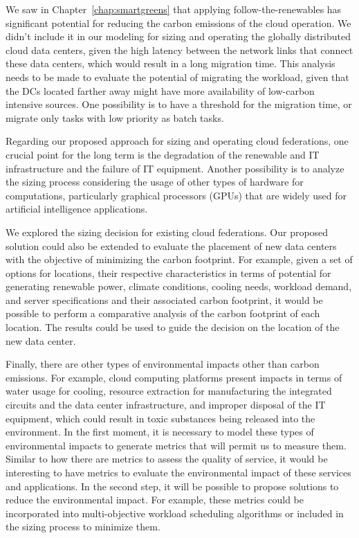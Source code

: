 We saw in Chapter~\ref{chap:smartgreens} that applying follow-the-renewables has significant potential for reducing the carbon emissions of the cloud operation. We didn't include it in our modeling for sizing and operating the globally distributed cloud data centers, given the high latency between the network links that connect these data centers, which would result in a long migration time. This analysis needs to be made to evaluate the potential of migrating the workload, given that the DCs located farther away might have more availability of low-carbon intensive sources. One possibility is to have a threshold for the migration time, or migrate only tasks with low priority as batch tasks.

Regarding our proposed approach for sizing and operating cloud federations, one crucial point for the long term is the degradation of the renewable and IT infrastructure and the failure of IT equipment. Another possibility is to analyze the sizing process considering the usage of other types of hardware for computations, particularly graphical processors (GPUs) that are widely used for artificial intelligence applications.

We explored the sizing decision for existing cloud federations. Our proposed solution could also be extended to evaluate the placement of new data centers with the objective of minimizing the carbon footprint. For example, given a set of options for locations, their respective characteristics in terms of potential for generating renewable power, climate conditions, cooling needs, workload demand, and server specifications and their associated carbon footprint, it would be possible to perform a comparative analysis of the carbon footprint of each location. The results could be used to guide the decision on the location of the new data center.

Finally, there are other types of environmental impacts other than carbon emissions. For example, cloud computing platforms present impacts in terms of water usage for cooling, resource extraction for manufacturing the integrated circuits and the data center infrastructure, and improper disposal of the IT equipment, which could result in toxic substances being released into the environment. In the first moment, it is necessary to model these types of environmental impacts to generate metrics that will permit us to measure them. Similar to how there are metrics to assess the quality of service, it would be interesting to have metrics to evaluate the environmental impact of these services and applications. In the second step, it will be possible to propose solutions to reduce the environmental impact. For example, these metrics could be incorporated into multi-objective workload scheduling algorithms or included in the sizing process to minimize them.

